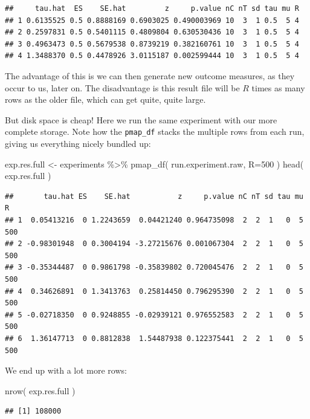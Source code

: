 \documentclass[
]{book}
\newenvironment{Shaded}{\begin{snugshade}}{\end{snugshade}}
\newcommand{\AttributeTok}[1]{\textcolor[rgb]{0.77,0.63,0.00}{#1}}
\newcommand{\DecValTok}[1]{\textcolor[rgb]{0.00,0.00,0.81}{#1}}
\newcommand{\FunctionTok}[1]{\textcolor[rgb]{0.00,0.00,0.00}{#1}}
\newcommand{\NormalTok}[1]{#1}
\newcommand{\OtherTok}[1]{\textcolor[rgb]{0.56,0.35,0.01}{#1}}
\newcommand{\SpecialCharTok}[1]{\textcolor[rgb]{0.00,0.00,0.00}{#1}}
\begin{document}
\begin{verbatim}
##     tau.hat  ES    SE.hat         z     p.value nC nT sd tau mu R
## 1 0.6135525 0.5 0.8888169 0.6903025 0.490003969 10  3  1 0.5  5 4
## 2 0.2597831 0.5 0.5401115 0.4809804 0.630530436 10  3  1 0.5  5 4
## 3 0.4963473 0.5 0.5679538 0.8739219 0.382160761 10  3  1 0.5  5 4
## 4 1.3488370 0.5 0.4478926 3.0115187 0.002599444 10  3  1 0.5  5 4
\end{verbatim}

The advantage of this is we can then generate new outcome measures, as they
occur to us, later on. The disadvantage is this result file will be \(R\)
times as many rows as the older file, which can get quite, quite large.

But disk space is cheap! Here we run the same experiment with our more
complete storage. Note how the \texttt{pmap\_df} stacks the
multiple rows from each run, giving us everything nicely bundled up:

\begin{Shaded}
\begin{Highlighting}[]
\NormalTok{exp.res.full }\OtherTok{\textless{}{-}}\NormalTok{ experiments }\SpecialCharTok{\%\textgreater{}\%} \FunctionTok{pmap\_df}\NormalTok{( run.experiment.raw, }\AttributeTok{R=}\DecValTok{500}\NormalTok{ )}
\FunctionTok{head}\NormalTok{( exp.res.full )}
\end{Highlighting}
\end{Shaded}

\begin{verbatim}
##       tau.hat ES    SE.hat           z     p.value nC nT sd tau mu   R
## 1  0.05413216  0 1.2243659  0.04421240 0.964735098  2  2  1   0  5 500
## 2 -0.98301948  0 0.3004194 -3.27215676 0.001067304  2  2  1   0  5 500
## 3 -0.35344487  0 0.9861798 -0.35839802 0.720045476  2  2  1   0  5 500
## 4  0.34626891  0 1.3413763  0.25814450 0.796295390  2  2  1   0  5 500
## 5 -0.02718350  0 0.9248855 -0.02939121 0.976552583  2  2  1   0  5 500
## 6  1.36147713  0 0.8812838  1.54487938 0.122375441  2  2  1   0  5 500
\end{verbatim}

We end up with a lot more rows:

\begin{Shaded}
\begin{Highlighting}[]
\FunctionTok{nrow}\NormalTok{( exp.res.full )}
\end{Highlighting}
\end{Shaded}

\begin{verbatim}
## [1] 108000
\end{verbatim}
\end{document}
